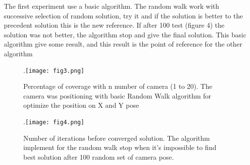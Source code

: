 The first experiment use a basic algorithm. The random walk work with successive selection of random solution, try it and if the solution is better to the precedent solution this is the new reference. If after 100 test (figure 4) the solution was not better, the algorithm stop and give the final solution. 
	This basic algorithm give some result, and this result is the point of reference for the other algorithm 
\begin{figure}
  \centering
  \hspace*{\fill}
	.\texttt{[image: fig3.png]}
  \hspace*{\fill}
  \caption{%
	Percentage of coverage with n number of camera (1 to 20). The camera was positioning with basic Random Walk algorithm for optimize the position on X and Y pose  }
  \label{fig:422}
\end{figure}
 \begin{figure}
  \centering
  \hspace*{\fill}
	.\texttt{[image: fig4.png]}
  \hspace*{\fill}
  \caption{%
	Number of iterations before converged solution.  The algorithm implement for the random walk stop when it’s impossible to find best solution after 100 random set of camera pose. }
  \label{fig:422}
\end{figure}
